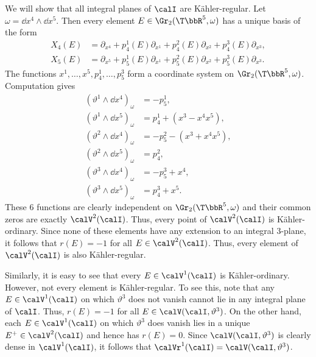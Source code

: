 \begin{example}
    We will show that all integral planes of $\calI$ are K\"ahler-regular. Let $\omega=\dd x^4\wedge\dd x^5$. Then every element $E\in\Gr_2(\T \bbR^5,\omega)$ has a unique basis of the form 
    \begin{align}
        X_4(E)&= \partial_{x^4}+p_4^1(E)\partial_{x^1}+p_4^2(E)\partial_{x^2}+p_4^3(E)\partial_{x^3},\\
        X_5(E)&=\partial_{x^5}+p_5^1(E)\partial_{x^1}+p_5^2(E)\partial_{x^2}+p_5^3(E)\partial_{x^3}.
    \end{align}
    The functions $x^1,\ldots,x^5,p_4^1,\ldots,p_5^3$ form a coordinate system on $\Gr_2(\T \bbR^5,\omega)$. Computation gives 
    \begin{align*}
        (\vartheta^1\wedge\dd x^4)_\omega&=-p_5^1,\\
        (\vartheta^1\wedge\dd x^5)_\omega&=p_4^1+(x^3-x^4x^5),\\
        (\vartheta^2\wedge\dd x^4)_\omega&=-p_5^2-(x^3+x^4x^5),\\
        (\vartheta^2\wedge\dd x^5)_\omega&=p_4^2,\\
        (\vartheta^3\wedge\dd x^4)_\omega&=-p_5^3+x^4,\\
        (\vartheta^3\wedge\dd x^5)_\omega&=p_4^3+x^5.
    \end{align*}
    These $6$ functions are clearly independent on $\Gr_2(\T \bbR^5,\omega)$ and their common zeros are exactly $\calV^2(\calI)$. Thus, every point of $\calV^2(\calI)$ is K\"ahler-ordinary. Since none of these elements have any extension to an integral $3$-plane, it follows that $r(E)=-1$ for all $E\in\calV^2(\calI)$. Thus, every element of $\calV^2(\calI)$ is also K\"ahler-regular.

    Similarly, it is easy to see that every $E\in\calV^1(\calI)$ is K\"ahler-ordinary. However, not every element is K\"ahler-regular. To see this, note that any $E\in\calV^1(\calI)$ on which $\vartheta^3$ does not vanish cannot lie in any integral plane of $\calI$. Thus, $r(E)=-1$ for all $E\in\calV(\calI,\vartheta^3)$. On the other hand, each $E\in\calV^1(\calI)$ on which $\vartheta^3$ does vanish lies in a unique $E^+\in\calV^2(\calI)$ and hence has $r(E)=0$. Since $\calV(\calI,\vartheta^3)$ is clearly dense in $\calV^1(\calI)$, it follows that $\calVr^1(\calI)=\calV(\calI,\vartheta^3)$.
\end{example}

